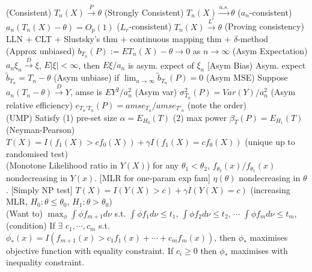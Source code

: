 \documentclass{article}
\renewcommand{\subsection}[1]{\text{\hl{[#1]}}}
\newcommand{\compact}{\\}
\begin{document}
\subsection{Consistency}
(Consistent) $T_n(X) \xrightarrow{P} \theta$
(Strongly Consistent) $T_n(X) \xrightarrow{a.s.} \theta$
($a_n$-consistent) $a_n(T_n(X) - \theta) = O_p(1)$
($L_r$-consistent) $T_n(X) \xrightarrow{L^r} \theta$
(Proving consistency) LLN + CLT + Slustsky's thm + continuous mapping thm +
$\delta$-method
\compact
\subsection{Asymptotic}
(Approx unbiased) $b_{T_n}(P) := ET_n(X) - \theta \rightarrow 0$ as
$n\rightarrow \infty$
(Asym Expectation) $a_n\xi_n \xrightarrow{D} \xi$, $E|\xi| < \infty$,
then $E\xi/a_n$ is asym. expect of $\xi_n$
[Asym Bias) Asym. expect $\tilde{b}_{T_n} = T_n - \theta$
(Asym unbiase) if $\lim_{n\rightarrow \infty} \tilde{b}_{T_n}(P) = 0$
(Asym MSE) Suppose $a_n(T_n - \theta) \xrightarrow{D} Y$, amse is
$EY^2/a_n^2$
(Asym var) $\sigma_{T_n}^2(P) = Var(Y) / a_n^2$
(Asym relative efficiency) $e_{T_n' T_n}(P) = amse_{T_n} / amse_{T'_n}$
(note the order)
\compact
\subsection{Hypo Test}
(UMP) Satisfy (1) pre-set size $\alpha = E_{H_0}(T)$ (2) max power $\beta_T(P) =
    E_{H_1}(T)$
(Neyman-Pearson) $T(X) = I(f_1(X) > c f_0(X)) + \gamma I(f_1(X) = c
    f_0(X))$ (unique up to randomised test)
\compact
\subsection{MLR}
(Monotone Likelihood ratio in $Y(X)$) for any $\theta_1 < \theta_2$,
$f_{\theta_2}(x) / f_{\theta_1}(x)$ nondecreasing in $Y(x)$.
    [MLR for one-param exp fam] $\eta(\theta)$ nondecreasing in $\theta$.
    [Simply NP test] $T(X) = I(Y(X) > c) + \gamma I(Y(X) = c)$ (increasing MLR,
$H_0: \theta \leq \theta_0$, $H_1: \theta > \theta_0$)
\compact
\subsection{Generalised NP}
(Want to) $\max_{\phi} \int \phi f_{m+1} d\nu$ s.t.
$\int \phi f_1 d\nu \leq t_1$,
$\int \phi f_2 d\nu \leq t_2$,
$\cdots$
$\int \phi f_m d\nu \leq t_m$,
(condition) If $\exists$ $c_1, \cdots, c_m$ s.t.
$\phi_*(x) = I(f_{m+1}(x) > c_1 f_1(x) + \cdots + c_mf_m(x))$,
then $\phi_*$ maximises objective function with equality constraint.
If $c_i\geq 0$ then $\phi_*$ maximises with inequality constraint.
\compact
\end{document}
